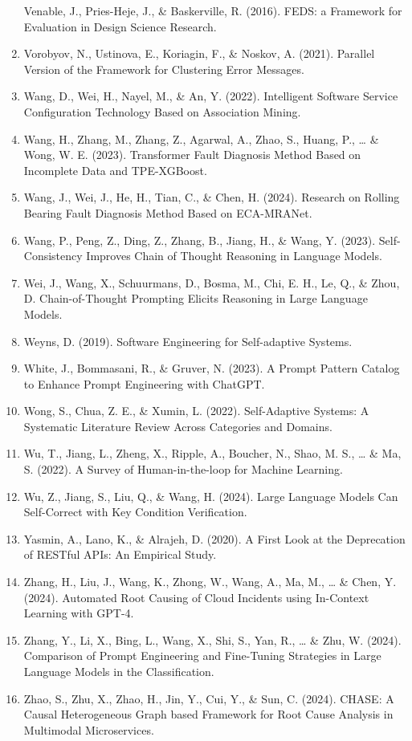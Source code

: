 \documentclass[
  a4paper,
  12pt,
  oneside,
  open=any,
  BCOR=12mm,
  DIV=14,
  parskip=half*,
  headsepline,
  footsepline,
  pointlessnumbers,
  liststotoc,
  numbers=noenddot,
  listof=totoc]{scrartcl}
\begin{document}
\begin{enumerate}
  Venable, J., Pries-Heje, J., \& Baskerville, R. (2016). FEDS: a
  Framework for Evaluation in Design Science Research.
\item
  Vorobyov, N., Ustinova, E., Koriagin, F., \& Noskov, A. (2021).
  Parallel Version of the Framework for Clustering Error Messages.
\item
  Wang, D., Wei, H., Nayel, M., \& An, Y. (2022). Intelligent Software
  Service Configuration Technology Based on Association Mining.
\item
  Wang, H., Zhang, M., Zhang, Z., Agarwal, A., Zhao, S., Huang, P.,
  \ldots{} \& Wong, W. E. (2023). Transformer Fault Diagnosis Method
  Based on Incomplete Data and TPE-XGBoost.
\item
  Wang, J., Wei, J., He, H., Tian, C., \& Chen, H. (2024). Research on
  Rolling Bearing Fault Diagnosis Method Based on ECA-MRANet.
\item
  Wang, P., Peng, Z., Ding, Z., Zhang, B., Jiang, H., \& Wang, Y.
  (2023). Self-Consistency Improves Chain of Thought Reasoning in
  Language Models.
\item
  Wei, J., Wang, X., Schuurmans, D., Bosma, M., Chi, E. H., Le, Q., \&
  Zhou, D. Chain-of-Thought Prompting Elicits Reasoning in Large
  Language Models.
\item
  Weyns, D. (2019). Software Engineering for Self-adaptive Systems.
\item
  White, J., Bommasani, R., \& Gruver, N. (2023). A Prompt Pattern
  Catalog to Enhance Prompt Engineering with ChatGPT.
\item
  Wong, S., Chua, Z. E., \& Xumin, L. (2022). Self-Adaptive Systems: A
  Systematic Literature Review Across Categories and Domains.
\item
  Wu, T., Jiang, L., Zheng, X., Ripple, A., Boucher, N., Shao, M. S.,
  \ldots{} \& Ma, S. (2022). A Survey of Human-in-the-loop for Machine
  Learning.
\item
  Wu, Z., Jiang, S., Liu, Q., \& Wang, H. (2024). Large Language Models
  Can Self-Correct with Key Condition Verification.
\item
  Yasmin, A., Lano, K., \& Alrajeh, D. (2020). A First Look at the
  Deprecation of RESTful APIs: An Empirical Study.
\item
  Zhang, H., Liu, J., Wang, K., Zhong, W., Wang, A., Ma, M., \ldots{} \&
  Chen, Y. (2024). Automated Root Causing of Cloud Incidents using
  In-Context Learning with GPT-4.
\item
  Zhang, Y., Li, X., Bing, L., Wang, X., Shi, S., Yan, R., \ldots{} \&
  Zhu, W. (2024). Comparison of Prompt Engineering and Fine-Tuning
  Strategies in Large Language Models in the Classification.
\item
  Zhao, S., Zhu, X., Zhao, H., Jin, Y., Cui, Y., \& Sun, C. (2024).
  CHASE: A Causal Heterogeneous Graph based Framework for Root Cause
  Analysis in Multimodal Microservices.
\end{enumerate}
\end{document}
